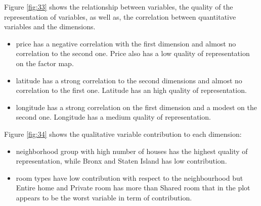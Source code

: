 \documentclass{FR16}
\begin{document}
\noindent Figure \ref{fig:33} shows the relationship between variables, the quality of the representation of variables, as well as, the correlation between quantitative variables and the dimensions.
\begin{itemize}
\itemsep0em 
\item price has a negative correlation with the first dimension and almost no correlation to the second one. Price also has a low  quality of representation on the factor map. 
\item latitude has a strong correlation to the second dimensions and almost no correlation to the first one. Latitude has an high quality of representation. 
\item longitude has a strong correlation on the first dimension and a modest on the second one. Longitude has a medium quality of representation.
\end{itemize}
Figure \ref{fig:34}  shows the qualitative variable contribution to each dimension:
\begin{itemize}
\item neighborhood group with high number of houses has the highest quality of representation, while Bronx and Staten Island has low contribution.
\item room types have low contribution with respect to the neighbourhood but Entire home and Private room has more than Shared room that in the plot appears to be the worst variable in term of contribution. 
\end{itemize}
\end{document}
